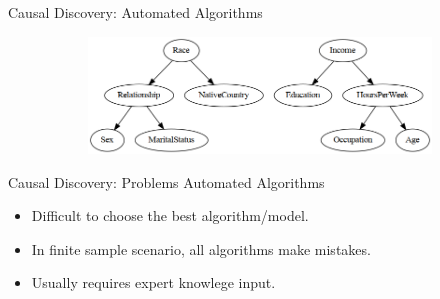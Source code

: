 \documentclass{beamer}
\begin{document}
\begin{frame}{Causal Discovery: Automated Algorithms}
\begin{figure}
		\begin{subfigure}{0.55 \textwidth}
			\centering
			\includegraphics[scale=0.25]{imgs/adult_pillai.png}
		\end{subfigure}
	\end{figure}
\end{frame}

\begin{frame}{Causal Discovery: Problems Automated Algorithms}
	\begin{itemize}
		\item Difficult to choose the best algorithm/model.
		\item In finite sample scenario, all algorithms make mistakes.
		\item Usually requires expert knowlege input.
	\end{itemize}

	\vspace{2em}

\end{frame}
\end{document}
